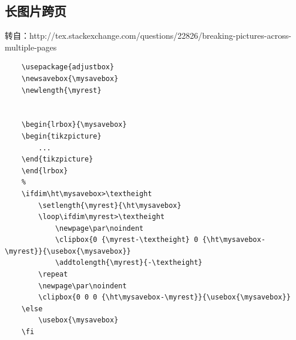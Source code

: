 \subsection{长图片跨页}

转自：http://tex.stackexchange.com/questions/22826/breaking-pictures-across-multiple-pages

\begin{lstlisting}
    \usepackage{adjustbox} 
    \newsavebox{\mysavebox}
    \newlength{\myrest}
    
     
    \begin{lrbox}{\mysavebox}
    \begin{tikzpicture}
        ...
    \end{tikzpicture}
    \end{lrbox}
    %
    \ifdim\ht\mysavebox>\textheight
        \setlength{\myrest}{\ht\mysavebox}
        \loop\ifdim\myrest>\textheight
            \newpage\par\noindent
            \clipbox{0 {\myrest-\textheight} 0 {\ht\mysavebox-\myrest}}{\usebox{\mysavebox}}
            \addtolength{\myrest}{-\textheight}
        \repeat
        \newpage\par\noindent
        \clipbox{0 0 0 {\ht\mysavebox-\myrest}}{\usebox{\mysavebox}}
    \else
        \usebox{\mysavebox}
    \fi
\end{lstlisting}